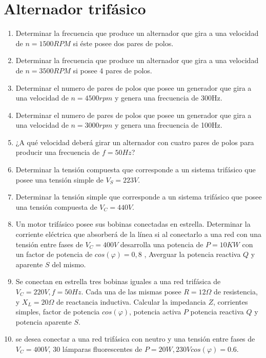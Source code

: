 \documentclass[../main]{subfiles}
\begin{document}
\thispagestyle{empty}


\chapter{Alternador trifásico}


\begin{enumerate}
    \item Determinar la frecuencia que produce un alternador que gira a una velocidad de $n=1500 RPM$ si éste posee dos pares de polos.
    \item Determinar la frecuencia que produce un alternador que gira a una velocidad de $n=3500 RPM$ si posee 4 pares de polos.
    \item Determinar el numero de pares de polos que posee un generador que gira a una velocidad de $n=4500rpm$ y genera una frecuencia de 300Hz.
    \item Determinar el numero de pares de polos que posee un generador que gira a una velocidad de $n=3000rpm$ y genera una frecuencia de 100Hz.
    \item ¿A qué velocidad deberá girar un alternador con cuatro pares de polos para producir una frecuencia de $f=50Hz$?
    \item Determinar la tensión compuesta que corresponde a un sistema trifásico que posee una tensión simple de $V_S=223V$.
    \item Determinar la tensión simple que corresponde a un sistema trifásico que posee una tensión compuesta de $V_C=440V$.
    \item Un motor trifásico posee sus bobinas conectadas en estrella. Determinar la corriente eléctrica que absorberá de la línea si al conectarlo a una red con una tensión entre fases de $V_C=400V$ desarrolla una potencia de $P=10KW$ con un factor de potencia de $cos(\varphi)=0,8$ , Averguar la potencia reactiva $Q$ y aparente $S$ del mismo.
    \item Se conectan en estrella tres bobinas iguales a una red trifásica de $V_C=220V, f=50Hz$. Cada una de las mismas posee $R=12\Omega$ de resistencia, y $X_L=20\Omega$ de reactancia inductiva. Calcular la impedancia $Z$, corrientes simples, factor de potencia $cos(\varphi)$, potencia activa $P$ potencia reactiva $Q$ y potencia aparente  $S$.
    \item se desea conectar a una red trifásica con neutro y una tensión entre fases de $V_C=400V$, 30 lámparas fluorescentes de $P=20W,230V cos(\varphi)=0.6$.

\end{enumerate}
\end{document}

